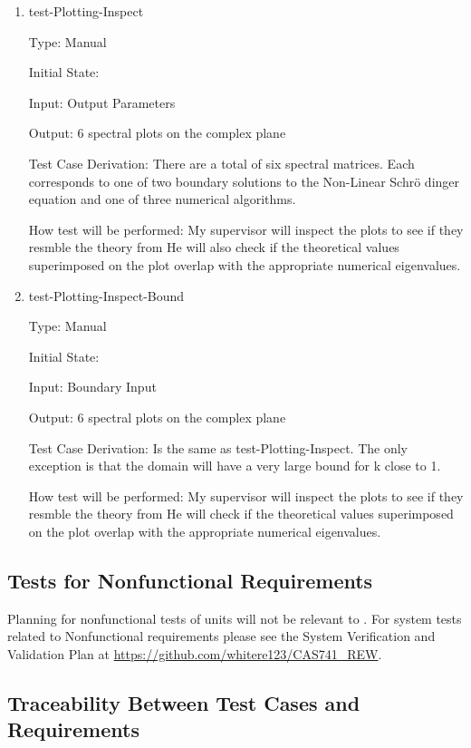 \documentclass[12pt, titlepage]{article}
\begin{document}
\begin{enumerate}				
	\item{test-Plotting-Inspect\\}
	
	Type: Manual
	
	Initial State: 
	
	Input: Output Parameters
	
	Output: 6 spectral plots on the complex plane
	
	Test Case Derivation: There are a total of six spectral matrices. Each 
	corresponds to one of two boundary solutions to the Non-Linear Schr\"{o} 
	dinger equation and one of three numerical algorithms. 
	
	How test will be performed: My supervisor will inspect the plots to see if 
	they resmble the theory from \cite{SegaletAl} He will also check if the 
	theoretical 
	values superimposed on the plot overlap with the appropriate numerical 
	eigenvalues.  

			
	\item{test-Plotting-Inspect-Bound\\}
	
	Type: Manual
	
	Initial State: 
	
	Input: Boundary Input
	
	Output: 6 spectral plots on the complex plane
	
	Test Case Derivation: Is the same as test-Plotting-Inspect. The only 
	exception is that the domain will have a very large bound for k close to 1.
	
	How test will be performed: My supervisor will inspect the plots to see if 
	they resmble the theory from \cite{SegaletAl} He will check if the 
	theoretical 
	values superimposed on the plot overlap with the appropriate numerical 
	eigenvalues. 
\end{enumerate}

\subsection{Tests for Nonfunctional Requirements}

Planning for nonfunctional tests of units will not be relevant to \progname. 
For system tests related to Nonfunctional requirements please see the System 
Verification and Validation Plan at 
\url{https://github.com/whitere123/CAS741_REW}. 

\subsection{Traceability Between Test Cases and Requirements}
\end{document}
